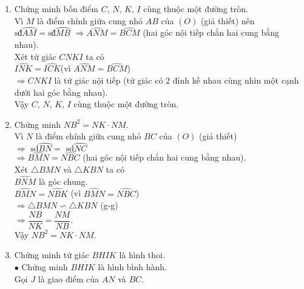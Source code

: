 \begin{bt}
{\begin{center}
	\end{center}
\begin{enumerate}
	\item	Chứng minh bốn điểm $C$, $N$, $K$, $I$ cùng thuộc một đường tròn.\\
	Vì $M$ là điểm chính giữa cung nhỏ $AB$ của $\left(O \right)$ (giả thiết) nên\\
	$\text{sđ}\wideparen{AM}= \text{sđ}\wideparen{MB}$
	$\Rightarrow \widehat{ANM}=\widehat{BCM}$ (hai góc nội tiếp chắn hai cung bằng nhau).\\
	Xét tứ giác $CNKI$ ta có\\
	$\widehat{INK}=\widehat{ICK}$(vì $\widehat{ANM}=\widehat{BCM}$)\\
	$\Rightarrow CNKI$ là tứ giác nội tiếp (tứ giác có $2$ đỉnh kề nhau cùng nhìn một cạnh dưới hai góc bằng nhau).\\
	Vậy $C$, $N$, $K$, $I$  cùng thuộc một đường tròn.
	\item Chứng minh $NB^2=NK\cdot NM$.\\
	Vì $N$ là điểm chính giữa cung nhỏ $BC$ của $\left(O \right)$ (giả thiết)\\
	$\Rightarrow \text{ sd}\wideparen{BN}=\text{ sd}\wideparen{NC}$\\
	$\Rightarrow \widehat{BMN}=\widehat{NBC}$ (hai góc nội tiếp chắn hai cung bằng nhau).\\
	Xét $\triangle BMN$ và $\triangle KBN$ ta có\\
	$\widehat{BNM}$ là góc chung.\\
	$\widehat{BMN}=\widehat{NBK}$ (vì $\widehat{BMN}=\widehat{NBC}$)\\
	$\Rightarrow \triangle BMN\backsim \triangle KBN $ (g-g)\\
	$\Rightarrow \dfrac{NB}{NK}=\dfrac{NM}{NB}$.\\
	Vậy $NB^2=NK\cdot NM$.
	\item Chứng minh tứ giác $BHIK$ là hình thoi.\\
	$\bullet$ Chứng minh $BHIK$ là hình bình hành.\\
	Gọi $J$ là giao điểm của $AN$ và $BC$.\\

\end{enumerate}}
\end{bt}
